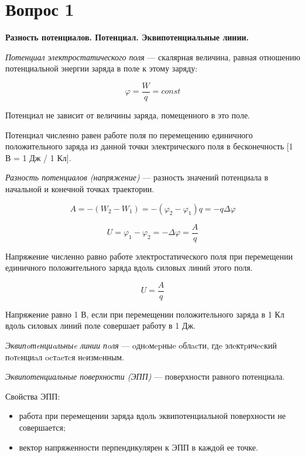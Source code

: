 \section*{Вопрос 1}

\textbf{Разность потенциалов. Потенциал. Эквипотенциальные линии.}

\textit{Потенциал электростатического поля} ---
скалярная величина, равная отношению 
потен­циальной энергии заряда в поле к этому заряду:

\begin{equation}\label{pot}
	\varphi = \dfrac{W}{q} = const
\end{equation}
 
Потенциал не зависит от величины заряда, помещенного в это поле.

Потенциал численно равен работе поля по перемещению 
единичного положительного заряда из данной точки 
электрического поля в бесконечность [1 В = 1 Дж / 1 Кл].

\textit{Разность потенциалов (напряжение)} --- 
разность значений потенциала в начальной и конечной точках траектории.

\begin{equation}
A = -(W_2 - W_1) = -(\varphi_2 - \varphi_1)q = -q\varDelta \varphi
\end{equation}

\begin{equation}
U = \varphi_1 - \varphi_2 = -\varDelta\varphi = \dfrac{A}{q}
\end{equation}

Напряжение численно равно работе электростатического поля 
при перемещении единичного положительного заряда 
вдоль силовых линий этого поля.

\begin{equation}
U = \dfrac{A}{q}
\end{equation}

Напряжение равно 1 В, 
если при перемещении положительного заряда в 1 Кл 
вдоль силовых линий поле совершает работу в 1 Дж.

\textit{Эквипoтeнциaльныe линии пoля} --- 
oднoмepныe oблacти, гдe элeктpичecкий пoтeнциaл ocтaeтcя нeизмeнным.

\textit{Эквипотенциальные поверхности (ЭПП)} --- 
поверхности равного потенциала.

Свойства ЭПП:

\begin{itemize}
	\item работа при перемещении заряда вдоль эквипотенциальной поверхности не совершается;
	\item вектор напряженности перпендикулярен к ЭПП в каждой ее точке.
\end{itemize}

